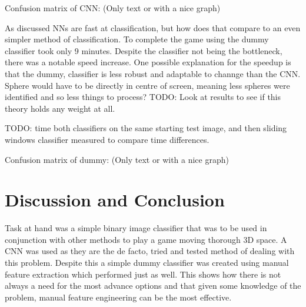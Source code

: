 \documentclass{article}
\begin{document}
Confusion matrix of CNN:
(Only text or with a nice graph)


As discussed NNs are fast at classification, but how does that compare to an even simpler method of classification.
To complete the game using the dummy classifier took only 9 minutes.
Despite the classifier not being the bottleneck, there was a notable speed increase.
One possible explanation for the speedup is that the dummy, classifier is less robust and adaptable to channge than the CNN.
Sphere would have to be directly in centre of screen, meaning less spheres were identified and so less things to process?
TODO: Look at results to see if this theory holds any weight at all.

TODO: time both classifiers on the same starting test image, and then sliding windows classifier measured to compare time differences.


Confusion matrix of dummy:
(Only text or with a nice graph)


\section{Discussion and Conclusion}

Task at hand was a simple binary image classifier that was to be used in conjunction with other methods to play a game moving thorough 3D space.
A CNN was used as they are the de facto, tried and tested method of dealing with this problem.
Despite this a simple dummy classifier was created using manual feature extraction which performed just as well.
This shows how there is not always a need for the most advance options and that given some knowledge of the problem, manual feature engineering can be the most effective.

\printbibliography
\end{document}
